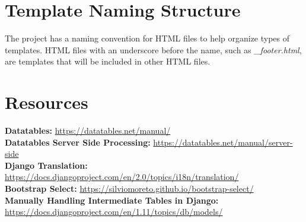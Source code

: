 \documentclass{article}
\begin{document}
\section{Template Naming Structure}
The project has a naming convention for HTML files to help organize types of templates.  HTML files with an underscore before the name, such as \textit{\_footer.html}, are templates that will be included in other HTML files.

\section{Resources}
\textbf{Datatables:} \url{https://datatables.net/manual/}
\\\textbf{Datatables Server Side Processing:} \url{https://datatables.net/manual/server-side}
\\\textbf{Django Translation:} \url{https://docs.djangoproject.com/en/2.0/topics/i18n/translation/}
\\\textbf{Bootstrap Select:} \url{https://silviomoreto.github.io/bootstrap-select/}
\\\textbf{Manually Handling Intermediate Tables in Django: }\url{https://docs.djangoproject.com/en/1.11/topics/db/models/}
\end{document}
